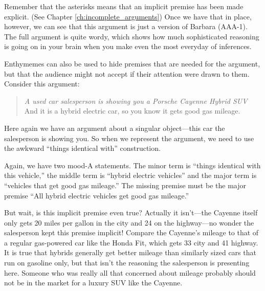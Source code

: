 Remember that the asterisks means that an implicit premise has been made explicit. (See Chapter \ref{ch:incomplete_arguments}) Once we have that in place, however, we can see that this argument is just a version of Barbara (AAA-1). The full argument is quite wordy, which shows how much sophisticated reasoning is going on in your brain when you make even the most everyday of inferences.

Enthymemes can also be used to hide premises that are needed for the argument, but that the audience might not accept if their attention were drawn to them. Consider this argument:

\begin{quotation}\noindent \textit{A used car salesperson is showing you a Porsche Cayenne Hybrid SUV} And it is a hybrid electric car, so you know it gets good gas mileage. \end{quotation}

Here again we have an argument about a singular object---this car the salesperson is showing you. So when we represent the argument, we need to use the awkward ``things identical with'' construction.

\begin{kormanize}
\end{kormanize}

Again, we have two mood-A statements. The minor term is ``things identical with this vehicle,'' the middle term is ``hybrid electric vehicles'' and the major term is ``vehicles that get good gas mileage.'' The missing premise must be the major premise ``All hybrid electric vehicles get good gas mileage.''

\begin{kormanize}
\end{kormanize}

But wait, is this implicit premise even true? Actually it isn't---the Cayenne itself only gets 20 miles per gallon in the city and 24 on the highway---no wonder the salesperson kept this premise implicit! Compare the Cayenne's mileage to that of a regular gas-powered car like the Honda Fit, which gets 33 city and 41 highway. It is true that hybrids generally get better mileage than similarly sized cars that run on gasoline only, but that isn't the reasoning the salesperson is presenting here. Someone who was really all that concerned about mileage probably should not be in the market for a luxury SUV like the Cayenne.

